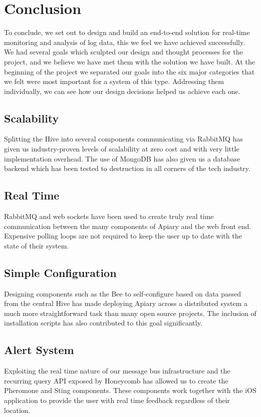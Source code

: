\section{Conclusion}

To conclude, we set out to design and build an end-to-end solution for real-time
monitoring and analysis of log data, this we feel we have achieved successfully.
We had several goals which sculpted our design and thought processes for the
project, and we believe we have met them with the solution we have built. At the
beginning of the project we separated our goals into the six major categories
that we felt were most important for a system of this type. Addressing them
individually, we can see how our design decisions helped us achieve each one.

\subsection{Scalability}
Splitting the Hive into several components communicating via RabbitMQ has given
us industry-proven levels of scalability at zero cost and with very little
implementation overhead. The use of MongoDB has also given us a database backend
which has been tested to destruction in all corners of the tech industry.
\subsection{Real Time}
RabbitMQ and web sockets have been used to create truly real time communication
between the many components of Apiary and the web front end. Expensive polling
loops are not required to keep the user up to date with the state of their
system.
\subsection{Simple Configuration}
Designing components such as the Bee to self-configure based on data passed from
the central Hive has made deploying Apiary across a distributed system a much
more straightforward task than many open source projects. The inclusion of
installation scripts has also contributed to this goal significantly.
\subsection{Alert System}
Exploiting the real time nature of our message bus infrastructure and the
recurring query API exposed by Honeycomb has allowed us to create the Pheromone
and Sting components. These components work together with the iOS application to
provide the user with real time feedback regardless of their location.
